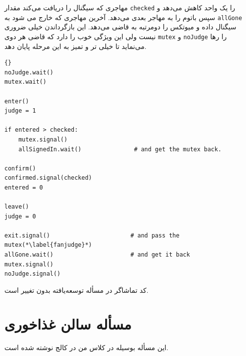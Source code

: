 \documentclass{book}
\newcommand{\clearemptydoublepage}{\newpage\cleardoublepage}
\begin{document}
    مهاجری که سیگنال را دریافت می‌کند مقدار  {\tt checked} را یک واحد کاهش می‌دهد و سپس باتوم را به مهاجر بعدی می‌دهد. 
    آخرین مهاجری که خارج می شود به {\tt allGone} سیگنال داده و میوتکس را دومرتبه به قاضی می‌دهد. این بازگرداندن خیلی ضروری نیست ولی 
    این ویژگی خوب را دارد که قاضی هر دوی  {\tt mutex} و {\tt noJudge}  را رها می‌نماید تا خیلی تر و تمیز به این مرحله پایان دهد. 

\newpage
\begin{latin}
\begin{lstlisting}[title=\rl{راهنمایی مسأله تالار \lr{Faneuil} (قاضی)}]{}
noJudge.wait()
mutex.wait()

enter()
judge = 1

if entered > checked:
    mutex.signal()
    allSignedIn.wait()               # and get the mutex back.

confirm()
confirmed.signal(checked)
entered = 0

leave()
judge = 0

exit.signal()                       # and pass the mutex(*\label{fanjudge}*)
allGone.wait()                      # and get it back
mutex.signal()
noJudge.signal()
\end{lstlisting}
\end{latin}

    کد تماشاگر در مسأله توسعه‌یافته بدون تغییر است. 


\clearemptydoublepage
\section{مسأله سالن غذاخوری}

    این مسأله بوسیله  در کلاس  من در کالج  نوشته شده است. 
\end{document}
